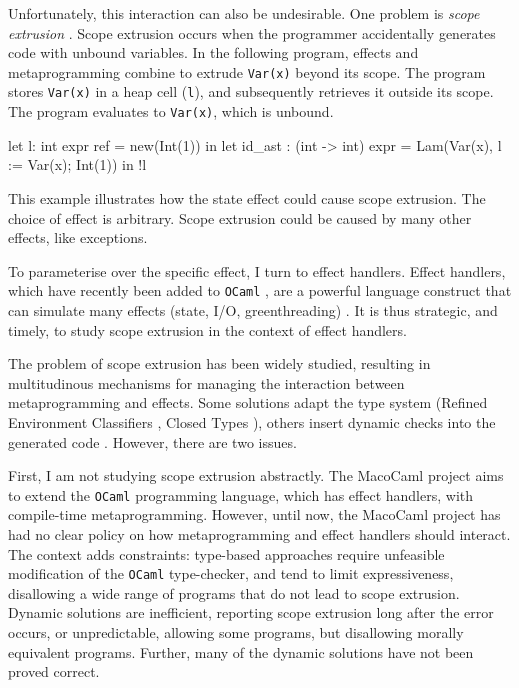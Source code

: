 Unfortunately, this interaction can also be undesirable. One problem is \textit{scope extrusion} \citep{kiselyov-14}. Scope extrusion occurs when the programmer accidentally generates code with unbound variables. In the following program, effects and metaprogramming combine to extrude \texttt{Var(x)} beyond its scope. The program stores \texttt{Var(x)} in a heap cell (\texttt{l}), and subsequently retrieves it outside its scope. The program evaluates to \texttt{Var(x)}, which is unbound.

\begin{ocaml}
let l: int expr ref = new(Int(1)) in 
let id_ast : (int -> int) expr = Lam(Var(x), l := Var(x); Int(1)) in
!l
\end{ocaml} 

This example illustrates how the state effect could cause scope extrusion. The choice of effect is arbitrary. Scope extrusion could be caused by many other effects, like exceptions.

To parameterise over the specific effect, I turn to effect handlers. Effect handlers, which have recently been added to \texttt{OCaml} \citep{sivaramakrishnan-21}, are a powerful language construct that can simulate many effects (state, I/O, greenthreading) \citep{pretnar-15}. It is thus strategic, and timely, to study scope extrusion in the context of effect handlers. 

The problem of scope extrusion has been widely studied, resulting in multitudinous mechanisms for managing the interaction between metaprogramming and effects. Some solutions adapt the type system (Refined Environment Classifiers \citep{kiselyov-16,isoda-24}, Closed Types \citep{calcagno-00}), others insert dynamic checks into the generated code \citep{kiselyov-14}. However, there are two issues.

First, I am not studying scope extrusion abstractly. The MacoCaml \citep{xie-2022} project aims to extend the \texttt{OCaml} programming language, which has effect handlers, with compile-time metaprogramming. However, until now, the MacoCaml project has had no clear policy on how metaprogramming and effect handlers should interact. The context adds constraints: type-based approaches require unfeasible modification of the \texttt{OCaml} type-checker, and tend to limit expressiveness, disallowing a wide range of programs that do not lead to scope extrusion. Dynamic solutions are inefficient, reporting scope extrusion long after the error occurs, or unpredictable, allowing some programs, but disallowing morally equivalent programs. Further, many of the dynamic solutions have not been proved correct.

